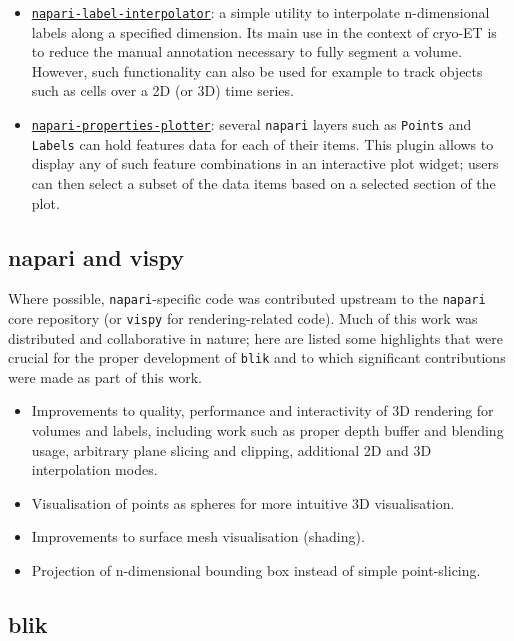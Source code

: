 \begin{itemize}[noitemsep] 
    \item \href{https://github.com/brisvag/napari-label-interpolator/}{\texttt{napari-label-interpolator}}: a simple utility to interpolate n-dimensional labels along a specified dimension. Its main use in the context of cryo-ET is to reduce the manual annotation necessary to fully segment a volume. However, such functionality can also be used for example to track objects such as cells over a 2D (or 3D) time series. 
    \item \href{https://github.com/brisvag/napari-properties-plotter/}{\texttt{napari-properties-plotter}}: several \texttt{napari} layers such as \texttt{Points} and \texttt{Labels} can hold features data for each of their items. This plugin allows to display any of such feature combinations in an interactive plot widget; users can then select a subset of the data items based on a selected section of the plot.
\end{itemize}

\subsection{napari and vispy}\label{napari-and-vispy}

Where possible, \texttt{napari}-specific code was contributed upstream to the \texttt{napari} core repository (or \texttt{vispy} for rendering-related code). Much of this work was distributed and collaborative in nature; here are listed some highlights that were crucial for the proper development of \texttt{blik} and to which significant contributions were made as part of this work.

\begin{itemize}[noitemsep] 
    \item Improvements to quality, performance and interactivity of 3D rendering for volumes and labels, including work such as proper depth buffer and blending usage, arbitrary plane slicing and clipping, additional 2D and 3D interpolation modes. 
    \item Visualisation of points as spheres for more intuitive 3D visualisation.
    \item Improvements to surface mesh visualisation (shading).
    \item Projection of n-dimensional bounding box instead of simple point-slicing.
\end{itemize}

\subsection{blik}

